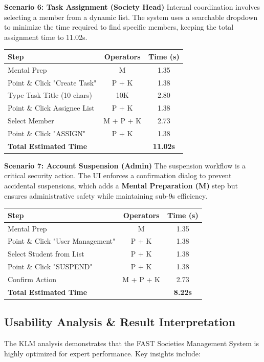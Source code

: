 \documentclass[12pt,a4paper]{article}
\begin{document}
\textbf{Scenario 6: Task Assignment (Society Head)}
Internal coordination involves selecting a member from a dynamic list. The system uses a searchable dropdown to minimize the time required to find specific members, keeping the total assignment time to 11.02s.
\begin{table}[H]
\centering
\begin{tabular}{lcc}
\toprule
\textbf{Step} & \textbf{Operators} & \textbf{Time (s)} \\
\midrule
Mental Prep & M & 1.35 \\
Point \& Click "Create Task" & P + K & 1.38 \\
Type Task Title (10 chars) & 10K & 2.80 \\
Point \& Click Assignee List & P + K & 1.38 \\
Select Member & M + P + K & 2.73 \\
Point \& Click "ASSIGN" & P + K & 1.38 \\
\midrule
\textbf{Total Estimated Time} & & \textbf{11.02s} \\
\bottomrule
\end{tabular}
\end{table}

\textbf{Scenario 7: Account Suspension (Admin)}
The suspension workflow is a critical security action. The UI enforces a confirmation dialog to prevent accidental suspensions, which adds a \textbf{Mental Preparation (M)} step but ensures administrative safety while maintaining sub-9s efficiency.
\begin{table}[H]
\centering
\begin{tabular}{lcc}
\toprule
\textbf{Step} & \textbf{Operators} & \textbf{Time (s)} \\
\midrule
Mental Prep & M & 1.35 \\
Point \& Click "User Management" & P + K & 1.38 \\
Select Student from List & P + K & 1.38 \\
Point \& Click "SUSPEND" & P + K & 1.38 \\
Confirm Action & M + P + K & 2.73 \\
\midrule
\textbf{Total Estimated Time} & & \textbf{8.22s} \\
\bottomrule
\end{tabular}
\end{table}

\subsection{Usability Analysis \& Result Interpretation}
The KLM analysis demonstrates that the FAST Societies Management System is highly optimized for expert performance. Key insights include:
\end{document}
